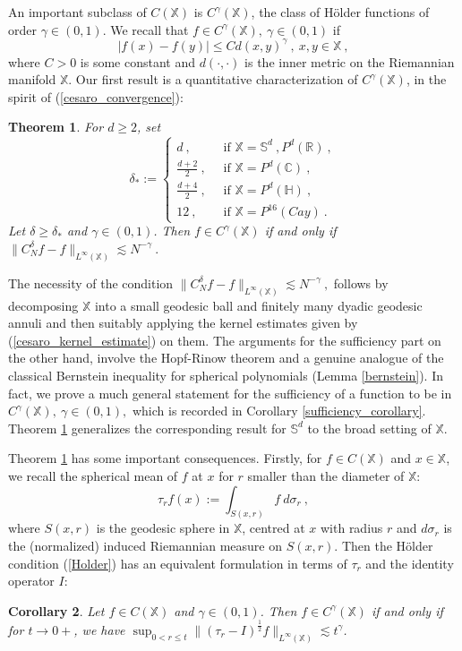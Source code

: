\documentclass[12pt]{amsart}
\newtheorem{theorem}{Theorem}[section]
\newtheorem{corollary}[theorem]{Corollary}
\theoremstyle{definition}
\newcommand{\R}{\mathbb R}%
\newcommand{\C}{\mathbb C}%
\newcommand{\Sb}{\mathbb S}%
\newcommand{\X}{\mathbb X}%
\newcommand{\Hb}{\mathbb H}%
\numberwithin{equation}{section}
\begin{document}
An important subclass of $C(\X)$ is $C^\gamma(\X)$, the class of H\"older functions of order $\gamma \in (0,1)$. We recall that $f \in C^\gamma(\X),\:\gamma \in (0,1)$ if
\begin{equation} \label{Holder}
|f(x)-f(y)| \le C d(x,y)^\gamma\:,\: x,y \in \X\:,
\end{equation}
where $C>0$ is some constant and $d(\cdot,\cdot)$ is the inner metric on the Riemannian manifold $\X$. Our first result is a quantitative characterization of $C^\gamma(\X)$, in the spirit of (\ref{cesaro_convergence}):
\begin{theorem} \label{thm_cesaro}
For $d \ge 2$, set \begin{equation} \label{cesaro_delta} \delta_*:=
\begin{cases}
	 d\:,\:&\text{ if } \X=\Sb^d\:,P^d(\R)\:, \\
	 \frac{d+2}{2}\:,\:&\text{ if } \X=P^d(\C)\:,\\
	 \frac{d+4}{2}\:,\:&\text{ if } \X=P^d(\Hb)\:,\\
	 12\:,\:&\text{ if } \X=P^{16}(Cay)\:.
	\end{cases}
\end{equation}
Let $\delta \ge \delta_*$ and $\gamma \in (0,1)$. Then $f \in C^\gamma(\X)$ if and only if $\|C^\delta_Nf-f\|_{L^\infty(\X)} \lesssim N^{-\gamma}\:.$
\end{theorem}  

The necessity of the condition  $\|C^\delta_Nf-f\|_{L^\infty(\X)} \lesssim N^{-\gamma}\:,$ follows by decomposing $\X$ into a small geodesic ball and finitely many dyadic geodesic annuli and then suitably applying the kernel estimates given by (\ref{cesaro_kernel_estimate}) on them. The arguments for the sufficiency part on the other hand, involve the Hopf-Rinow theorem and a genuine analogue of the classical Bernstein inequality for spherical polynomials (Lemma \ref{bernstein}). In fact, we prove a much general statement for the sufficiency of a function to be in $C^\gamma(\X),\:\gamma \in (0,1),$ which is recorded in Corollary \ref{sufficiency_corollary}. Theorem \ref{thm_cesaro} generalizes the corresponding result for $\Sb^d$ \cite[Theorem 2.13]{Huynh} to the broad setting of $\X$. 

Theorem \ref{thm_cesaro} has some important consequences. Firstly, for $f \in C(\X)$ and $x \in \X$, we recall the spherical mean of $f$ at $x$ for $r$ smaller than the diameter of $\X$:
\begin{equation*}
\tau_rf(x):= \int_{S(x,r)} f\:d\sigma_r\:, 
\end{equation*}
where $S(x,r)$ is the geodesic sphere in $\X$, centred at $x$ with radius $r$ and $d\sigma_r$ is the (normalized) induced Riemannian measure on $S(x,r)$. Then the H\"older condition (\ref{Holder}) has an equivalent formulation in terms of $\tau_r$ and the identity operator $I$:
\begin{corollary} \label{corollary1}
Let $f \in C(\X)$ and $\gamma \in (0,1)$. Then $f \in C^\gamma(\X)$ if and only if for $t \to 0+$, we have $\displaystyle\sup_{0<r \le t} \|(\tau_r -I)^\frac{1}{2}f\|_{L^\infty(\X)} \lesssim t^\gamma$\:.
\end{corollary}
\end{document}
